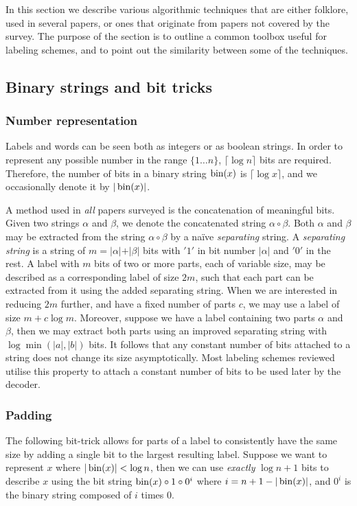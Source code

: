 In this section we describe  various algorithmic techniques that are either folklore, used in several papers,  or ones that  originate from papers not covered by the survey.
The purpose of the  section is to outline  a common toolbox useful for labeling schemes, and to point out the similarity between some of the techniques. 

\subsection{Binary strings and bit tricks} \label{section:Misc-Tools}
\subsubsection{Number representation}
Labels  and words can be seen both as integers or as  boolean strings.
In order to represent any possible number in the range $\{1 \dots n\}$, $\lceil \log n \rceil$ bits are required.
Therefore, the number of bits in  a binary string $\operatorname{bin}(x)$ is $\lceil \log x \rceil$, and we occasionally denote it by $ \vert \operatorname{bin}(x) \vert$.

A method  used in \emph{all} papers surveyed   is the concatenation of  meaningful bits.
Given two strings $\alpha$ and $\beta$, we denote the concatenated string  $\alpha \circ \beta$.
Both $\alpha$ and $\beta$ may be extracted  from the string $\alpha \circ \beta$  by a na\"ive  \emph{separating} string.
 A \emph{separating string} is a string of $m= \vert \alpha \vert + \vert \beta \vert$ bits with $'1'$ in bit number $\vert \alpha \vert$ and $'0'$ in the rest.
A  label with $m$ bits of two or more parts, each of variable size, may be described as a corresponding label of size $2m$, such that each part can be extracted from it using the added separating string.
When we are interested in reducing $2m$ further, and have a fixed number of parts  $c$, we may use a label of size $m+ c \log m$.
Moreover, suppose we have  a label containing two parts  $\alpha$ and $\beta$, then we may extract both parts using an improved separating string with  $\log \min(\vert a \vert ,\vert b \vert)$  bits.
It follows that any constant number of bits attached to a string does not change its size asymptotically. 
Most labeling schemes reviewed utilise this property to attach a constant number of bits to be   used later by the decoder.

	\subsubsection{Padding}\label{tec:padding}
	The following bit-trick allows for parts of a label to consistently have the same size by adding a single bit to the largest resulting label.
	Suppose we want to represent $x$ where  $\vert \operatorname{bin}(x) \vert < \log n$, then we can use \textit{exactly} $\log n +1$ bits to describe $x$ using the bit string $\operatorname{bin}(x) \circ 1 \circ 0^i$ where $i=n+1 - \vert \operatorname{bin}(x) \vert$, and  $0^i$ is the binary string composed of $i$ times $0$.
		

